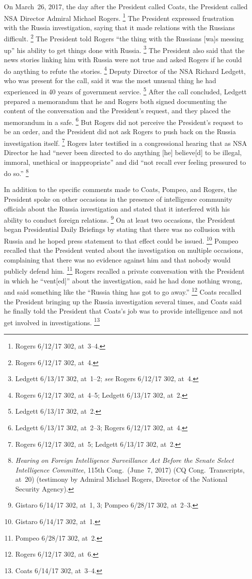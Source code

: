 On March~26, 2017, the day after the President called Coats, the President called NSA Director Admiral Michael Rogers.%
\footnote{Rogers 6/12/17 302, at~3--4.}
The President expressed frustration with the Russia investigation, saying that it made relations with the Russians difficult.%
\footnote{Rogers 6/12/17 302, at~4.}
The President told Rogers ``the thing with the Russians [wa]s messing up'' his ability to get things done with Russia.%
\footnote{Ledgett 6/13/17 302, at~1--2;
\textit{see} Rogers 6/12/17 302, at~4.}
The President also said that the news stories linking him with Russia were not true and asked Rogers if he could do anything to refute the stories.%
\footnote{Rogers 6/12/17 302, at~4--5;
Ledgett 6/13/17 302, at~2.}
Deputy Director of the NSA Richard Ledgett, who was present for the call, said it was the most unusual thing he had experienced in 40 years of government service.%
\footnote{Ledgett 6/13/17 302, at~2.}
After the call concluded, Ledgett prepared a memorandum that he and Rogers both signed documenting the content of the conversation and the President's request, and they placed the memorandum in a safe.%
\footnote{Ledgett 6/13/17 302, at~2--3;
Rogers 6/12/17 302, at~4.}
But Rogers did not perceive the President's request to be an order, and the President did not ask Rogers to push back on the Russia investigation itself.%
\footnote{Rogers 6/12/17 302, at~5;
Ledgett 6/13/17 302, at~2.}
Rogers later testified in a congressional hearing that as NSA Director he had ``never been directed to do anything [he] believe[d] to be illegal, immoral, unethical or inappropriate'' and did ``not recall ever feeling pressured to do so.''%
\footnote{\textit{Hearing on Foreign Intelligence Surveillance Act Before the Senate Select Intelligence Committee}, 115th Cong.\ (June~7, 2017) (CQ Cong.\ Transcripts, at~20) (testimony by Admiral Michael Rogers, Director of the National Security Agency).}

In addition to the specific comments made to Coats, Pompeo, and Rogers, the President spoke on other occasions in the presence of intelligence community officials about the Russia investigation and stated that it interfered with his ability to conduct foreign relations.%
\footnote{Gistaro 6/14/17 302, at~1, 3;
Pompeo 6/28/17 302, at~2--3.}
On at least two occasions, the President began Presidential Daily Briefings by stating that there was no collusion with Russia and he hoped press statement to that effect could be issued.%
\footnote{Gistaro 6/14/17 302, at~1.}
Pompeo recalled that the President vented about the investigation on multiple occasions, complaining that there was no evidence against him and that nobody would publicly defend him.%
\footnote{Pompeo 6/28/17 302, at~2.}
Rogers recalled a private conversation with the President in which he ``vent[ed]'' about the investigation, said he had done nothing wrong, and said something like the ``Russia thing has got to go away.''%
\footnote{Rogers 6/12/17 302, at~6.}
Coats recalled the President bringing up the Russia investigation several times, and Coats said he finally told the President that Coats's job was to provide intelligence and not get involved in investigations.%
\footnote{Coats 6/14/17 302, at~3--4.}

